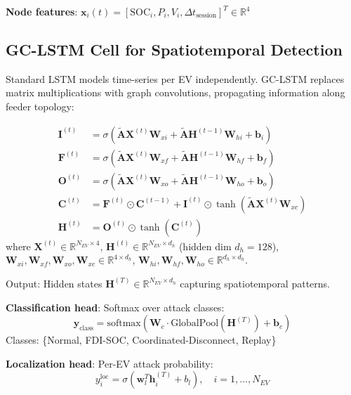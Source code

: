 \documentclass[journal]{IEEEtran}
\begin{document}
\textbf{Node features}: $\mathbf{x}_i(t) = [\text{SOC}_i, P_i, V_i, \Delta t_{\text{session}}]^T \in \mathbb{R}^4$

\subsection{GC-LSTM Cell for Spatiotemporal Detection}

Standard LSTM models time-series per EV independently. GC-LSTM replaces matrix multiplications with graph convolutions, propagating information along feeder topology:

\begin{align}
\mathbf{I}^{(t)} &= \sigma(\tilde{\mathbf{A}} \mathbf{X}^{(t)} \mathbf{W}_{xi} + \tilde{\mathbf{A}} \mathbf{H}^{(t-1)} \mathbf{W}_{hi} + \mathbf{b}_i) \\
\mathbf{F}^{(t)} &= \sigma(\tilde{\mathbf{A}} \mathbf{X}^{(t)} \mathbf{W}_{xf} + \tilde{\mathbf{A}} \mathbf{H}^{(t-1)} \mathbf{W}_{hf} + \mathbf{b}_f) \\
\mathbf{O}^{(t)} &= \sigma(\tilde{\mathbf{A}} \mathbf{X}^{(t)} \mathbf{W}_{xo} + \tilde{\mathbf{A}} \mathbf{H}^{(t-1)} \mathbf{W}_{ho} + \mathbf{b}_o) \\
\mathbf{C}^{(t)} &= \mathbf{F}^{(t)} \odot \mathbf{C}^{(t-1)} + \mathbf{I}^{(t)} \odot \tanh(\tilde{\mathbf{A}} \mathbf{X}^{(t)} \mathbf{W}_{xc}) \\
\mathbf{H}^{(t)} &= \mathbf{O}^{(t)} \odot \tanh(\mathbf{C}^{(t)})
\end{align}
where $\mathbf{X}^{(t)} \in \mathbb{R}^{N_{EV} \times 4}$, $\mathbf{H}^{(t)} \in \mathbb{R}^{N_{EV} \times d_h}$ (hidden dim $d_h=128$), $\mathbf{W}_{xi}, \mathbf{W}_{xf}, \mathbf{W}_{xo}, \mathbf{W}_{xc} \in \mathbb{R}^{4 \times d_h}$, $\mathbf{W}_{hi}, \mathbf{W}_{hf}, \mathbf{W}_{ho} \in \mathbb{R}^{d_h \times d_h}$.

Output: Hidden states $\mathbf{H}^{(T)} \in \mathbb{R}^{N_{EV} \times d_h}$ capturing spatiotemporal patterns.

\textbf{Classification head}: Softmax over attack classes:
\begin{equation}
\mathbf{y}_{\text{class}} = \text{softmax}(\mathbf{W}_c \cdot \text{GlobalPool}(\mathbf{H}^{(T)}) + \mathbf{b}_c)
\end{equation}
Classes: \{Normal, FDI-SOC, Coordinated-Disconnect, Replay\}

\textbf{Localization head}: Per-EV attack probability:
\begin{equation}
y_i^{\text{loc}} = \sigma(\mathbf{w}_l^T \mathbf{h}_i^{(T)} + b_l), \quad i = 1, \ldots, N_{EV}
\end{equation}
\end{document}

